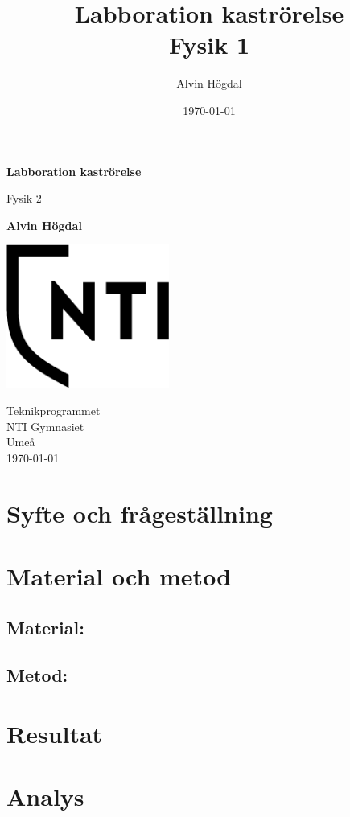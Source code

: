 \documentclass[11p]{article}
\title{Labboration kaströrelse \\ \small Fysik 1}
\author{Alvin Högdal}
\date{\today}
\begin{document}
    \begin{titlepage}
        \begin{center}
            \vspace*{1cm}

            \Huge
            \textbf{Labboration kaströrelse}

            \vspace{0.5cm}
            \LARGE
            Fysik 2

            \vspace{1.5cm}

            \textbf{Alvin Högdal}

            \vfill


            \vspace{0.8cm}

            \includegraphics[width=0.4\textwidth]{../images/NTI Gymnasiet_Symbol_print_svart.png}

            \Large
            Teknikprogrammet\\
            NTI Gymnasiet\\
            Umeå\\
            \today

        \end{center}
    \end{titlepage}
    \tableofcontents
    \newpage
    \section{Syfte och frågeställning}

    \section{Material och metod}

    \subsection{Material:}


    \subsection{Metod:}


    \section{Resultat}



    \section{Analys}
\end{document}
